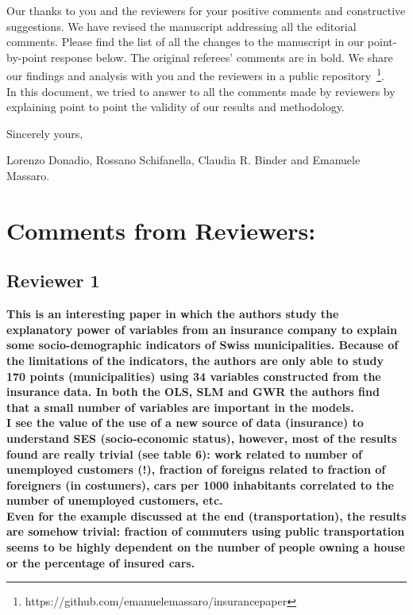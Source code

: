 \documentclass[12pt]{article}
\begin{document}
Our thanks to you and the reviewers for your positive comments and constructive suggestions. We have revised the manuscript addressing all the editorial comments. Please find the list of all the changes to the manuscript in our point-by-point response below. The original referees’ comments are in bold. We share our findings and analysis with you and the reviewers in a public repository~\footnote{https://github.com/emanuelemassaro/insurancepaper}.\\

In this document, we tried to answer to all the comments made by reviewers by explaining point to point the validity of our results and methodology.

Sincerely yours,

Lorenzo Donadio, Rossano Schifanella, Claudia R. Binder and Emanuele Massaro.



\section*{Comments from Reviewers:}

\subsection*{Reviewer 1}

\textbf{This is an interesting paper in which the authors study the explanatory power of variables from an insurance company to explain some socio-demographic indicators of Swiss municipalities. Because of the limitations of the indicators, the authors are only able to study 170 points (municipalities) using 34 variables constructed from the insurance data. In both the OLS, SLM and GWR the authors find that a small number of variables are important in the models.\\I see the value of the use of a new source of data (insurance) to understand SES (socio-economic status), however, most of the results found are really trivial (see table 6): work related to number of unemployed customers (!), fraction of foreigns related to fraction of foreigners (in costumers), cars per 1000 inhabitants correlated to the number of unemployed customers, etc.\\Even for the example discussed at the end (transportation), the results are somehow trivial: fraction of commuters using public transportation seems to be highly dependent on the number of people owning a house or the percentage of insured cars.}
\end{document}
